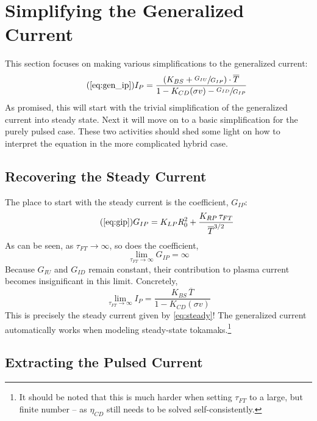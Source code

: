 \section{Simplifying the Generalized Current}

This section focuses on making various simplifications to the generalized current:
\begin{equation}
	\tag{\ref{eq:gen_ip}}
	I_P = \frac{ \left( K_{BS} + \sfrac{ G_{IU} }{ G_{IP} } \right) \cdot \overline T }{ 1 - K_{CD} ( \sigma v ) - \sfrac{ G_{ID} }{ G_{IP} } }
\end{equation}
As promised, this will start with the trivial simplification of the generalized current into steady state. Next it will move on to a basic simplification for the purely pulsed case. These two activities should shed some light on how to interpret the equation in the more complicated hybrid case.

\subsection{Recovering the Steady Current}

The place to start with the steady current is the  coefficient, $G_{IP}$:
\begin{equation}
	\tag{\ref{eq:gip}}
	G_{IP} = K_{LP} R_0^2 + \frac{ K_{RP} \, \tau_{FT} }{ \overline T ^ {3/2} }
\end{equation}
As can be seen, as $\tau_{FT} \to \infty$, so does the coefficient,
\begin{equation}
	\lim_{\tau_{FT} \to \infty} G_{IP} = \infty
\end{equation}
Because $G_{IU}$ and $G_{ID}$ remain constant, their contribution to plasma current becomes insignificant in this limit. Concretely,
\begin{equation}
	\label{eq:tau_inf}
	\lim_{\tau_{FT} \to \infty} I_P = \frac{ K_{BS} \, \overline T }{ 1 - K_{CD} ( \sigma v ) }
\end{equation}
This is precisely the steady current given by \cref{eq:steady}! The generalized current automatically works when modeling steady-state tokamaks.\footnote{ It should be noted that this is much harder when setting $\tau_{FT}$ to a large, but finite number -- as $\eta_{CD}$ still needs to be solved self-consistently. }

\subsection{Extracting the Pulsed Current}

